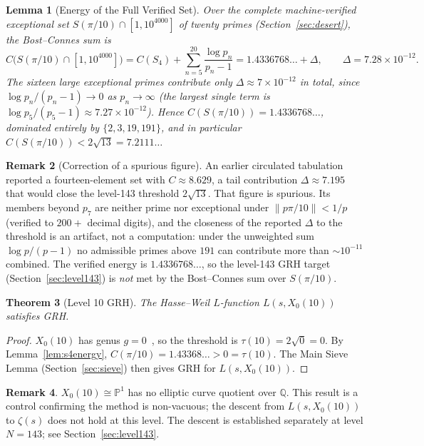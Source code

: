 \documentclass[11pt,letterpaper]{article}
\newtheorem{theorem}{Theorem}[section]
\newtheorem{lemma}[theorem]{Lemma}
\theoremstyle{definition}
\newtheorem{remark}[theorem]{Remark}
\begin{document}
\begin{lemma}[Energy of the Full Verified Set]\label{lem:fullenergy}
Over the complete machine-verified exceptional set
$S(\pi/10)\cap[1,10^{4000}]$ of twenty primes (Section~\ref{sec:desert}), the
Bost--Connes sum is
\[
  C\bigl(S(\pi/10)\cap[1,10^{4000}]\bigr)
    = C(S_4) + \sum_{n=5}^{20} \frac{\log p_n}{p_n - 1}
    = 1.4336768\ldots + \Delta,
  \qquad \Delta = 7.28\times 10^{-12}.
\]
The sixteen large exceptional primes contribute only $\Delta\approx 7\times
10^{-12}$ \emph{in total}, since $\log p_n/(p_n-1)\to 0$ as $p_n\to\infty$ (the
largest single term is $\log p_5/(p_5-1)\approx 7.27\times10^{-12}$).  Hence
$C(S(\pi/10)) = 1.4336768\ldots$, dominated entirely by $\{2,3,19,191\}$, and in
particular $C(S(\pi/10)) < 2\sqrt{13} = 7.2111\ldots$
\end{lemma}

\begin{remark}[Correction of a spurious figure]
An earlier circulated tabulation reported a fourteen-element set with
$C \approx 8.629$, a tail contribution $\Delta\approx 7.195$ that would close the
level-143 threshold $2\sqrt{13}$.  That figure is spurious.  Its members beyond
$p_7$ are neither prime nor exceptional under $\|p\pi/10\| < 1/p$ (verified to
$200{+}$ decimal digits), and the closeness of the reported $\Delta$ to the
threshold is an artifact, not a computation: under the unweighted sum
$\log p/(p-1)$ no admissible primes above $191$ can contribute more than
$\sim 10^{-11}$ combined.  The verified energy is $1.4336768\ldots$, so the
level-143 GRH target (Section~\ref{sec:level143}) is \emph{not} met by the
Bost--Connes sum over $S(\pi/10)$.
\end{remark}

\begin{theorem}[Level 10 GRH]\label{thm:level10}
The Hasse--Weil $L$-function $L(s, X_0(10))$ satisfies GRH\@.
\end{theorem}
\begin{proof}
$X_0(10)$ has genus $g = 0$~\cite{LMFDB}, so the threshold is
$\tau(10) = 2\sqrt{0} = 0$.
By Lemma~\ref{lem:s4energy}, $C(\pi/10) = 1.43368\ldots > 0 = \tau(10)$.
The Main Sieve Lemma (Section~\ref{sec:sieve}) then gives GRH for $L(s, X_0(10))$.
\end{proof}

\begin{remark}
$X_0(10) \cong \mathbb{P}^1$ has no elliptic curve quotient over $\mathbb{Q}$.
This result is a control confirming the method is non-vacuous; the descent from
$L(s, X_0(10))$ to $\zeta(s)$ does not hold at this level.  The descent is
established separately at level $N = 143$; see Section~\ref{sec:level143}.
\end{remark}
\end{document}
